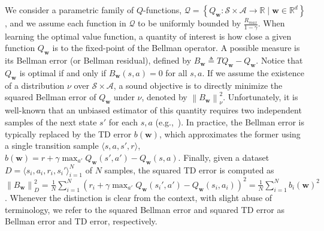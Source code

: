 \documentclass{article}
\newcommand{\norm}[1]{\left\lVert #1 \right\rVert}
\begin{document}
We consider a parametric family of $Q$-functions, $\mathcal{Q} = \left\{ Q_{\bm{w}} : \mathcal{S}\times\mathcal{A} \rightarrow \mathbb{R} \mid \bm{w}\in\mathbb{R}^d\right\}$, and we assume each function in $\mathcal{Q}$ to be uniformly bounded by $\frac{R_{max}}{1-\gamma}$. When learning the optimal value function, a quantity of interest is how close a given function $Q_{\bm{w}}$ is to the fixed-point of the Bellman operator. A possible measure is its Bellman error (or Bellman residual), defined by $B_{\bm{w}} \triangleq TQ_{\bm{w}} - Q_{\bm{w}}$. Notice that $Q_{\bm{w}}$ is optimal if and only if $B_{\bm{w}}(s,a) = 0$ for all $s,a$. If we assume the existence of a distribution $\nu$ over $\mathcal{S}\times\mathcal{A}$, a sound objective is to directly minimize the squared Bellman error of $Q_{\bm{w}}$ under $\nu$, denoted by $\norm{B_{\bm{w}}}_{\nu}^2$. Unfortunately, it is well-known that an unbiased estimator of this quantity requires two independent samples of the next state $s'$ for each $s,a$ (e.g.,~\cite{maillard2010finite}). In practice, the Bellman error is typically replaced by the TD error $b(\bm{w})$, which approximates the former using a single transition sample $\langle s,a,s',r \rangle$, $b(\bm{w}) = r + \gamma\max_{a'}Q_{\bm{w}}(s',a') - Q_{\bm{w}}(s,a)$. Finally, given a dataset $D = \langle s_i,a_i,r_i,s_i' \rangle_{i=1}^{N}$ of $N$ samples, the squared TD error is computed as $\norm{B_{\bm{w}}}_{D}^2 = \frac{1}{N}\sum_{i=1}^N (r_i + \gamma \max_{a'} Q_{\bm{w}}(s_i',a') - Q_{\bm{w}}(s_i,a_i))^2 = \frac{1}{N}\sum_{i=1}^N b_i(\bm{w})^2$. Whenever the distinction is clear from the context, with slight abuse of terminology, we refer to the squared Bellman error and squared TD error as Bellman error and TD error, respectively.
\end{document}
